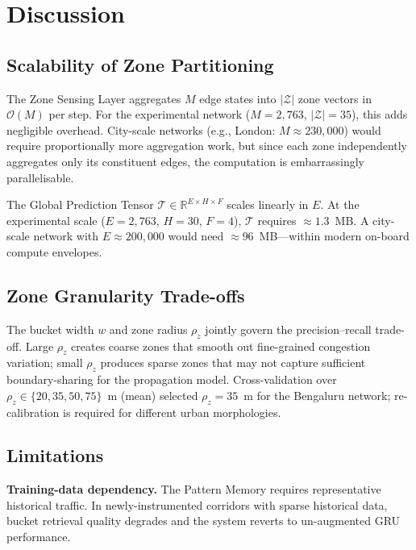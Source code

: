 \documentclass[journal,letterpaper,10pt]{IEEEtran}
\theoremstyle{definition}
\theoremstyle{remark}
\newcommand{\bigO}[1]{\mathcal{O}\!\left(#1\right)}
\newcommand{\R}{\mathbb{R}}
\newcommand{\zones}{\mathcal{Z}}
\begin{document}
\section{Discussion}
\label{sec:disc}

\subsection{Scalability of Zone Partitioning}

The Zone Sensing Layer aggregates $M$ edge states into $|\zones|$
zone vectors in $\bigO{M}$ per step.  For the experimental network
($M=2{,}763$, $|\zones|=35$), this adds negligible overhead.
City-scale networks (e.g., London: $M\approx230{,}000$) would
require proportionally more aggregation work, but since each zone
independently aggregates only its constituent edges, the computation
is embarrassingly parallelisable.

The Global Prediction Tensor
$\mathcal{T}\in\R^{E\times H\times F}$ scales linearly in $E$.
At the experimental scale ($E=2{,}763$, $H=30$, $F=4$),
$\mathcal{T}$ requires $\approx\!1.3$~MB.  A city-scale network
with $E\approx200{,}000$ would need $\approx\!96$~MB---within
modern on-board compute envelopes.

\subsection{Zone Granularity Trade-offs}

The bucket width $w$ and zone radius $\rho_z$ jointly govern the
precision--recall trade-off.  Large $\rho_z$ creates coarse zones
that smooth out fine-grained congestion variation; small $\rho_z$
produces sparse zones that may not capture sufficient boundary-sharing
for the propagation model.  Cross-validation over
$\rho_z\in\{20,35,50,75\}$~m (mean) selected $\rho_z=35$~m for
the Bengaluru network; re-calibration is required for different
urban morphologies.

\subsection{Limitations}

\noindent\textbf{Training-data dependency.}\enspace
The Pattern Memory requires representative historical traffic.  In
newly-instrumented corridors with sparse historical data, bucket
retrieval quality degrades and the system reverts to un-augmented GRU
performance.
\end{document}
